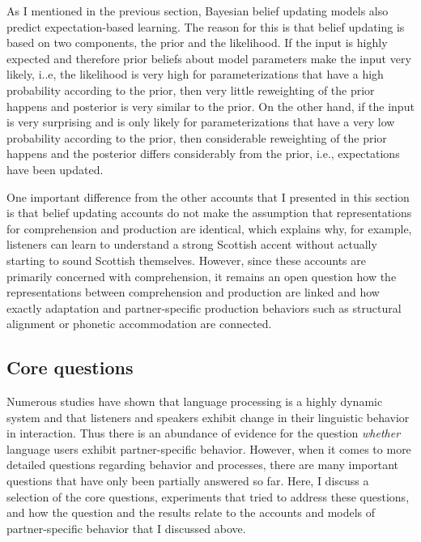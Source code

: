 As I mentioned in the previous section, Bayesian belief updating models also predict expectation-based learning. The reason for this is that belief updating is based on 
two components, the prior and the likelihood. If the input is highly expected and therefore prior beliefs about model parameters make the input very likely, 
i..e, the likelihood is very high for parameterizations that have a high probability according to the prior, then very little reweighting of the prior happens
and posterior is very similar to the prior. On the other hand, if the input is very surprising and  is only likely for parameterizations that have a very low 
probability according to the prior, then considerable reweighting of the prior happens and the posterior differs considerably from the prior, i.e., expectations have been updated.
 
One important difference from the other accounts that I presented in this section is that belief updating accounts do not make the assumption that representations
for comprehension and production are identical, which explains why, for example, listeners can learn to understand a strong Scottish accent without actually starting to sound Scottish themselves.
However, since these accounts are primarily concerned with comprehension, it remains an open question how the representations between
comprehension and production are linked and how exactly adaptation and partner-specific production behaviors such as structural alignment or phonetic accommodation are connected.


\subsection{Core questions}
\label{subsec:partner-behav-core-questions}

Numerous studies have shown that language processing is a highly dynamic system and that listeners and speakers exhibit change in their linguistic behavior in interaction.
Thus there is an abundance of evidence for the question \textit{whether}  language users exhibit partner-specific behavior. However, when it comes to more detailed questions
regarding behavior and processes, there are many important questions that have only been partially answered so far. Here, I discuss a selection of the core questions, experiments
that tried to address these questions, and how the question and the results relate to the accounts and models of partner-specific behavior that I discussed above.

